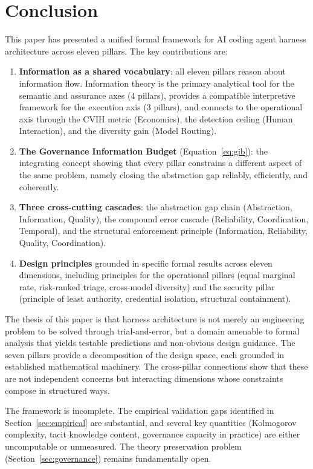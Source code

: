 \documentclass[11pt, a4paper]{googledeepmind}
\begin{document}
\section{Conclusion}
\label{sec:conclusion}

This paper has presented a unified formal framework for AI coding agent harness architecture across eleven pillars. The key contributions are:

\begin{enumerate}
    \item \textbf{Information as a shared vocabulary}: all eleven pillars reason about information flow. Information theory is the primary analytical tool for the semantic and assurance axes (4 pillars), provides a compatible interpretive framework for the execution axis (3 pillars), and connects to the operational axis through the CVIH metric (Economics), the detection ceiling (Human Interaction), and the diversity gain (Model Routing).
    \item \textbf{The Governance Information Budget} (Equation~\ref{eq:gib}): the integrating concept showing that every pillar constrains a different aspect of the same problem, namely closing the abstraction gap reliably, efficiently, and coherently.
    \item \textbf{Three cross-cutting cascades}: the abstraction gap chain (Abstraction, Information, Quality), the compound error cascade (Reliability, Coordination, Temporal), and the structural enforcement principle (Information, Reliability, Quality, Coordination).
    \item \textbf{Design principles} grounded in specific formal results across eleven dimensions, including principles for the operational pillars (equal marginal rate, risk-ranked triage, cross-model diversity) and the security pillar (principle of least authority, credential isolation, structural containment).
\end{enumerate}

The thesis of this paper is that harness architecture is not merely an engineering problem to be solved through trial-and-error, but a domain amenable to formal analysis that yields testable predictions and non-obvious design guidance. The seven pillars provide a decomposition of the design space, each grounded in established mathematical machinery. The cross-pillar connections show that these are not independent concerns but interacting dimensions whose constraints compose in structured ways.

The framework is incomplete. The empirical validation gaps identified in Section~\ref{sec:empirical} are substantial, and several key quantities (Kolmogorov complexity, tacit knowledge content, governance capacity in practice) are either uncomputable or unmeasured. The theory preservation problem (Section~\ref{sec:governance}) remains fundamentally open.
\end{document}
